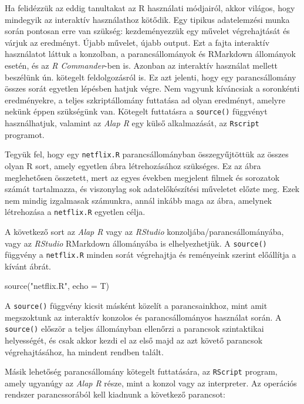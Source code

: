 \documentclass[
]{book}
\newenvironment{Shaded}{\begin{snugshade}}{\end{snugshade}}
\newcommand{\AttributeTok}[1]{\textcolor[rgb]{0.77,0.63,0.00}{#1}}
\newcommand{\FunctionTok}[1]{\textcolor[rgb]{0.00,0.00,0.00}{#1}}
\newcommand{\NormalTok}[1]{#1}
\newcommand{\StringTok}[1]{\textcolor[rgb]{0.31,0.60,0.02}{#1}}
\begin{document}
Ha felidézzük az eddig tanultakat az R használati módjairól, akkor világos, hogy mindegyik az interaktív használathoz kötődik. Egy tipikus adatelemzési munka során pontosan erre van szükség: kezdeményezzük egy művelet végrehajtását és várjuk az eredményt. Újabb művelet, újabb output. Ezt a fajta interaktív használatot láttuk a konzolban, a parancsállományok és RMarkdown állományok esetén, és az \emph{R Commander}-ben is. Azonban az interaktív használat mellett beszélünk ún. kötegelt feldolgozásról is. Ez azt jelenti, hogy egy parancsállomány összes sorát egyetlen lépésben hatjuk végre. Nem vagyunk kíváncsiak a soronkénti eredményekre, a teljes szkriptállomány futtatása ad olyan eredményt, amelyre nekünk éppen szükségünk van. Kötegelt futtatásra a \texttt{source()} függvényt használhatjuk, valamint az \emph{Alap R} egy külső alkalmazását, az \texttt{Rscript} programot.

Tegyük fel, hogy egy \texttt{netflix.R} parancsállományban összegyűjtöttük az összes olyan R sort, amely egyetlen ábra létrehozásához szükséges. Ez az ábra meglehetősen összetett, mert az egyes években megjelent filmek és sorozatok számát tartalmazza, és viszonylag sok adatelőkészítési műveletet előzte meg. Ezek nem mindig izgalmasak számunkra, annál inkább maga az ábra, amelynek létrehozása a \texttt{netflix.R} egyetlen célja.

A következő sort az \emph{Alap R} vagy az \emph{RStudio} konzoljába/parancsállományába, vagy az \emph{RStudio} RMarkdown állományába is elhelyezhetjük. A \texttt{source()} függvény a \texttt{netflix.R} minden sorát végrehajtja és reményeink szerint előállítja a kívánt ábrát.

\begin{Shaded}
\begin{Highlighting}[]
\FunctionTok{source}\NormalTok{(}\StringTok{"netflix.R"}\NormalTok{, }\AttributeTok{echo =}\NormalTok{ T)}
\end{Highlighting}
\end{Shaded}

A \texttt{source()} függvény kicsit másként közelít a parancsainkhoz, mint amit megszoktunk az interaktív konzolos és parancsállományos használat során. A \texttt{source()} először a teljes állományban ellenőrzi a parancsok szintaktikai helyességét, és csak akkor kezdi el az első majd az azt követő parancsok végrehajtásához, ha mindent rendben talált.

Másik lehetőség parancsállomány kötegelt futtatására, az \texttt{RScript} program, amely ugyanúgy az \emph{Alap R} része, mint a konzol vagy az interpreter. Az operációs rendszer parancssorából kell kiadnunk a következő parancsot:
\end{document}
